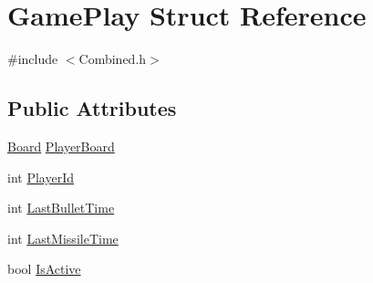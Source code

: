 \hypertarget{structGamePlay}{\section{Game\-Play Struct Reference}
\label{structGamePlay}
}


{\ttfamily \#include $<$Combined.\-h$>$}

\subsection*{Public Attributes}
\begin{DoxyCompactItemize}
\item 
\hyperlink{classBoard}{Board} \hyperlink{structGamePlay_a39c04914ca869ee339464e75b2477466}{Player\-Board}
\item 
int \hyperlink{structGamePlay_acd6b4be0629dac15c7ea5154ce4ff392}{Player\-Id}
\item 
int \hyperlink{structGamePlay_a3953c8c4a1da0dd46a3ef927e31f6632}{Last\-Bullet\-Time}
\item 
int \hyperlink{structGamePlay_ae141282049dcb7b13d1186472cfd4e88}{Last\-Missile\-Time}
\item 
bool \hyperlink{structGamePlay_af408f47ae31ed92aedd293a42ab0e098}{Is\-Active}
\end{DoxyCompactItemize}


